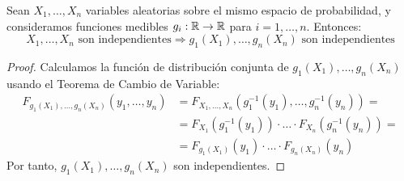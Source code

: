 \begin{prop}
    Sean $X_1, \ldots, X_n$ variables aleatorias sobre el mismo espacio de probabilidad, y consideramos funciones medibles $g_i: \mathbb{R} \to \mathbb{R}$ para $i = 1, \ldots, n$. Entonces:
    \begin{equation*}
        X_1, \ldots, X_n \text{ son independientes} \Longrightarrow g_1(X_1), \ldots, g_n(X_n) \text{ son independientes}
    \end{equation*}
\end{prop}
\begin{proof}
    Calculamos la función de distribución conjunta de $g_1(X_1), \ldots, g_n(X_n)$ usando el Teorema de Cambio de Variable:
    \begin{align*}
        F_{g_1(X_1), \ldots, g_n(X_n)}(y_1, \ldots, y_n)
        &= F_{X_1, \ldots, X_n}(g_1^{-1}(y_1), \ldots, g_n^{-1}(y_n))
        =\\&= F_{X_1}(g_1^{-1}(y_1)) \cdot \ldots \cdot F_{X_n}(g_n^{-1}(y_n))
        =\\&= F_{g_1(X_1)}(y_1) \cdot \ldots \cdot F_{g_n(X_n)}(y_n)
    \end{align*}
    Por tanto, $g_1(X_1), \ldots, g_n(X_n)$ son independientes.
\end{proof}



